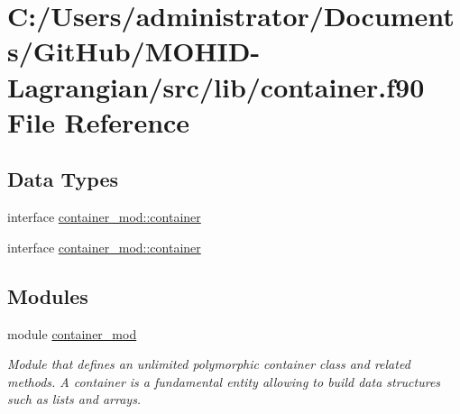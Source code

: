 \hypertarget{container_8f90}{}\section{C\+:/\+Users/administrator/\+Documents/\+Git\+Hub/\+M\+O\+H\+I\+D-\/\+Lagrangian/src/lib/container.f90 File Reference}
\label{container_8f90}
\subsection*{Data Types}
\begin{DoxyCompactItemize}
\item 
interface \mbox{\hyperlink{structcontainer__mod_1_1container}{container\+\_\+mod\+::container}}
\item 
interface \mbox{\hyperlink{structcontainer__mod_1_1container}{container\+\_\+mod\+::container}}
\end{DoxyCompactItemize}
\subsection*{Modules}
\begin{DoxyCompactItemize}
\item 
module \mbox{\hyperlink{namespacecontainer__mod}{container\+\_\+mod}}
\begin{DoxyCompactList}\small\item\em Module that defines an unlimited polymorphic container class and related methods. A container is a fundamental entity allowing to build data structures such as lists and arrays. \end{DoxyCompactList}\end{DoxyCompactItemize}
